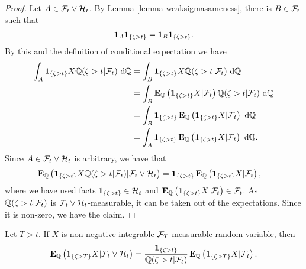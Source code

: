 \begin{proof}
	Let $A \in \mathcal{F}_t \vee \mathcal{H}_t$. By Lemma \ref{lemma-weaksigmasameness}, there is $B \in \mathcal{F}_t$ such that
	\begin{align}
	\boldsymbol{1}_A \boldsymbol{1}_{ \{ \zeta > t \} } = \boldsymbol{1}_B \boldsymbol{1}_{ \{ \zeta > t \} } .
	\end{align}
	By this and the definition of conditional expectation we have
	\begin{align}
	\int_A \boldsymbol{1}_{ \{ \zeta > t \} } X \mathbb{Q}( \zeta > t | \mathcal{F}_t ) \ \mathrm{d} \mathbb{Q} & = \int_B \boldsymbol{1}_{ \{ \zeta > t \} } X \mathbb{Q}( \zeta > t | \mathcal{F}_t ) \ \mathrm{d} \mathbb{Q} \\
	&= \int_B \operatorname{\boldsymbol{\mathrm{E}}}_{\mathbb{Q}} \left( \boldsymbol{1}_{ \{ \zeta > t \} } X | \mathcal{F}_t \right) \mathbb{Q}( \zeta > t | \mathcal{F}_t ) \ \mathrm{d} \mathbb{Q} \\
	&= \int_B \boldsymbol{1}_{ \{ \zeta > t \} } \operatorname{\boldsymbol{\mathrm{E}}}_{\mathbb{Q}} \left( \boldsymbol{1}_{ \{ \zeta > t \} } X | \mathcal{F}_t \right) \ \mathrm{d} \mathbb{Q} \\
	&= \int_A \boldsymbol{1}_{ \{ \zeta > t \} } \operatorname{\boldsymbol{\mathrm{E}}}_{\mathbb{Q}} \left( \boldsymbol{1}_{ \{ \zeta > t \} } X | \mathcal{F}_t \right) \ \mathrm{d} \mathbb{Q} .
	\end{align}
	Since $A \in \mathcal{F}_t \vee \mathcal{H}_t$ is arbitrary, we have that
	\begin{align}
	\operatorname{\boldsymbol{\mathrm{E}}}_{\mathbb{Q}} \left( \boldsymbol{1}_{ \{ \zeta > t \} } X \mathbb{Q}( \zeta > t | \mathcal{F}_t ) | \mathcal{F}_t \vee \mathcal{H}_t \right) 
	&= \boldsymbol{1}_{ \{ \zeta > t \} } \operatorname{\boldsymbol{\mathrm{E}}}_{\mathbb{Q}} \left( \boldsymbol{1}_{ \{ \zeta > t \} } X | \mathcal{F}_t \right),
	\end{align}
	where we have used facts $\boldsymbol{1}_{ \{ \zeta > t \} } \in \mathcal{H}_t$ and $\operatorname{\boldsymbol{\mathrm{E}}}_{\mathbb{Q}} \left( \boldsymbol{1}_{ \{ \zeta > t \} } X | \mathcal{F}_t \right) \in \mathcal{F}_t$. As $\mathbb{Q}( \zeta > t | \mathcal{F}_t )$ is $\mathcal{F}_t \vee \mathcal{H}_t$-measurable, it can be taken out of the expectations. Since it is non-zero, we have the claim.
\end{proof}

\begin{thm}
\label{eq_takingthedefaultinformationout}
Let $T > t$. If $X$ is non-negative integrable $\mathcal{F}_T$-measurable random variable, then
	\begin{align}
	\operatorname{\boldsymbol{\mathrm{E}}}_{\mathbb{Q}} \left( \boldsymbol{1}_{ \{ \zeta > T \} } X | \mathcal{F}_t \vee \mathcal{H}_t \right) = \frac{\boldsymbol{1}_{ \{ \zeta > t \} }}{\mathbb{Q} (\zeta > t | \mathcal{F}_t )} \operatorname{\boldsymbol{\mathrm{E}}}_{\mathbb{Q}}  \left( \boldsymbol{1}_{ \{ \zeta > T \} } X | \mathcal{F}_t \right) .
	\end{align}
\end{thm}

